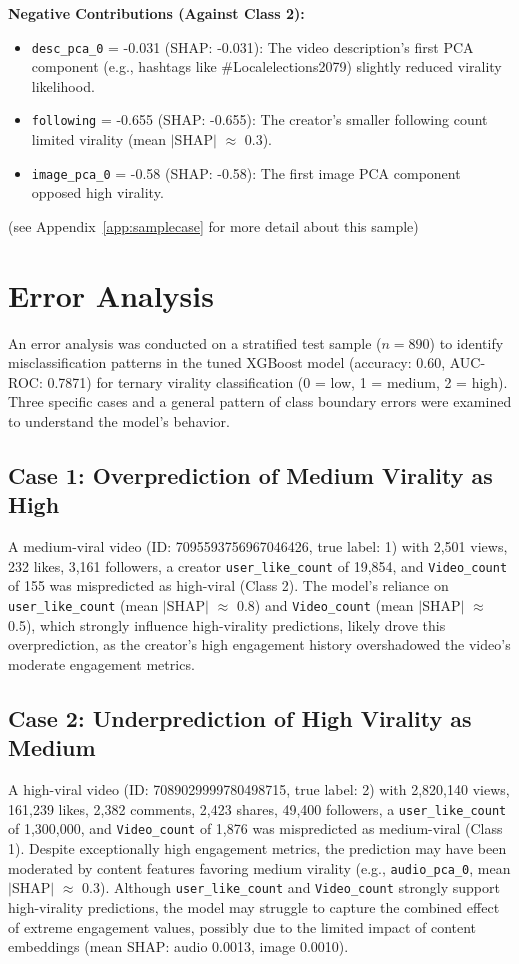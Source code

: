 \documentclass[12pt,a4paper]{report}
\begin{document}
\textbf{Negative Contributions (Against Class 2):}
\begin{itemize}
    \item \texttt{desc\_pca\_0} = -0.031 (SHAP: -0.031): The video description’s first PCA component (e.g., hashtags like \#Localelections2079) slightly reduced virality likelihood.
    \item \texttt{following} = -0.655 (SHAP: -0.655): The creator’s smaller following count limited virality (mean $|$SHAP$|$ $\approx$ 0.3).
    \item \texttt{image\_pca\_0} = -0.58 (SHAP: -0.58): The first image PCA component opposed high virality.
\end{itemize}
(see Appendix~\ref{app:samplecase} for more detail about this sample)
\newpage


\newpage
\section{Error Analysis}
An error analysis was conducted on a stratified test sample ($n=890$) to identify misclassification patterns in the tuned XGBoost model (accuracy: 0.60, AUC-ROC: 0.7871) for ternary virality classification (0 = low, 1 = medium, 2 = high). Three specific cases and a general pattern of class boundary errors were examined to understand the model’s behavior.

\subsection{Case 1: Overprediction of Medium Virality as High}
A medium-viral video (ID: 7095593756967046426, true label: 1) with 2,501 views, 232 likes, 3,161 followers, a creator \texttt{user\_like\_count} of 19,854, and \texttt{Video\_count} of 155 was mispredicted as high-viral (Class 2). The model’s reliance on \texttt{user\_like\_count} (mean $|$SHAP$|$ $\approx$ 0.8) and \texttt{Video\_count} (mean $|$SHAP$|$ $\approx$ 0.5), which strongly influence high-virality predictions, likely drove this overprediction, as the creator’s high engagement history overshadowed the video’s moderate engagement metrics.

\subsection{Case 2: Underprediction of High Virality as Medium}
A high-viral video (ID: 7089029999780498715, true label: 2) with 2,820,140 views, 161,239 likes, 2,382 comments, 2,423 shares, 49,400 followers, a \texttt{user\_like\_count} of 1,300,000, and \texttt{Video\_count} of 1,876 was mispredicted as medium-viral (Class 1). Despite exceptionally high engagement metrics, the prediction may have been moderated by content features favoring medium virality (e.g., \texttt{audio\_pca\_0}, mean $|$SHAP$|$ $\approx$ 0.3). Although \texttt{user\_like\_count} and \texttt{Video\_count} strongly support high-virality predictions, the model may struggle to capture the combined effect of extreme engagement values, possibly due to the limited impact of content embeddings (mean SHAP: audio 0.0013, image 0.0010).
\end{document}
